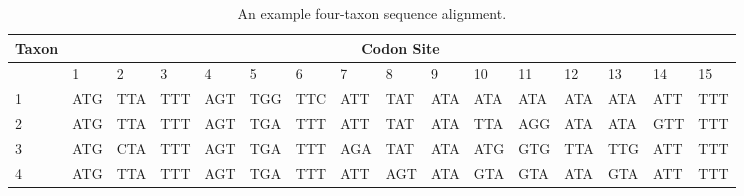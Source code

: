 \setlength\tabcolsep{0 pt}
\begin{table}[h!]
  \begin{tabular}{|l|lllllllllllllll|}
    \multicolumn{1}{c}{Taxon} & \multicolumn{15}{c}{Codon Site} \\
    \hline
                        & 1   & 2                        & 3   & 4                        & 5   & 6                        & 7   & 8                        & 9   & 10                       & 11  & 12                       & 13  & 14                       & 15  \\
    1 \hspace{1em}      & ATG & \cellcolor{lightgray}TTA & TTT & \cellcolor{lightgray}AGT & TGG & \cellcolor{lightgray}TTC & ATT & \cellcolor{lightgray}TAT & ATA & \cellcolor{lightgray}ATA & ATA & \cellcolor{lightgray}ATA & ATA & \cellcolor{lightgray}ATT & TTT \\
    2                   & ATG & \cellcolor{lightgray}TTA & TTT & \cellcolor{lightgray}AGT & TGA & \cellcolor{lightgray}TTT & ATT & \cellcolor{lightgray}TAT & ATA & \cellcolor{lightgray}TTA & AGG & \cellcolor{lightgray}ATA & ATA & \cellcolor{lightgray}GTT & TTT \\
    3                   & ATG & \cellcolor{lightgray}CTA & TTT & \cellcolor{lightgray}AGT & TGA & \cellcolor{lightgray}TTT & AGA & \cellcolor{lightgray}TAT & ATA & \cellcolor{lightgray}ATG & GTG & \cellcolor{lightgray}TTA & TTG & \cellcolor{lightgray}ATT & TTT \\
    4                   & ATG & \cellcolor{lightgray}TTA & TTT & \cellcolor{lightgray}AGT & TGA & \cellcolor{lightgray}TTT & ATT & \cellcolor{lightgray}AGT & ATA & \cellcolor{lightgray}GTA & GTA & \cellcolor{lightgray}ATA & GTA & \cellcolor{lightgray}ATT & TTT \\
    \hline
  \end{tabular}
  \caption{An example four-taxon sequence alignment.}
  \label{tab:sampalign}
\end{table}
\setlength\tabcolsep{6 pt}